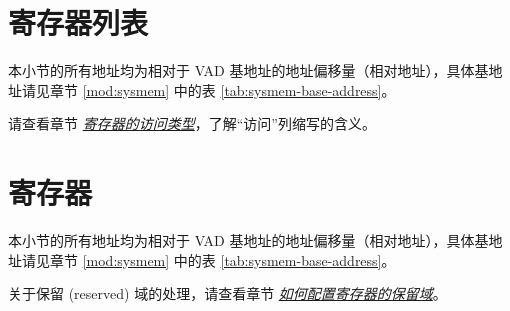 \documentclass[main\_\_CN.tex]{subfiles}
\begin{document}

\newpage
\hypertarget{vad-reg-summ}{}
\section{寄存器列表}
\label{sec:vad-reg-summ}

本小节的所有地址均为相对于 VAD 基地址的地址偏移量（相对地址），具体基地址请见章节 \ref{mod:sysmem} \textit{} 中的表 \ref{tab:sysmem-base-address}。

请查看章节 \hyperref[glossary-access-types]{\textit{寄存器的访问类型}}，了解“访问”列缩写的含义。






\newpage
\section{寄存器}

本小节的所有地址均为相对于 VAD 基地址的地址偏移量（相对地址），具体基地址请见章节 \ref{mod:sysmem} \textit{} 中的表 \ref{tab:sysmem-base-address}。

关于保留 (reserved) 域的处理，请查看章节 \hyperref[programming-reserved-field]{\textit{如何配置寄存器的保留域}}。


\end{document}
